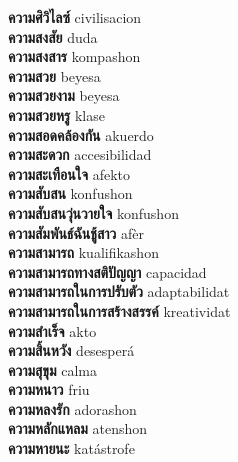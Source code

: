 \textbf{ ความศิวิไลซ์  } civilisacion \\
\textbf{ ความสงสัย  } duda \\
\textbf{ ความสงสาร  } kompashon \\
\textbf{ ความสวย  } beyesa \\
\textbf{ ความสวยงาม  } beyesa \\
\textbf{ ความสวยหรู  } klase \\
\textbf{ ความสอดคล้องกัน  } akuerdo \\
\textbf{ ความสะดวก  } accesibilidad \\
\textbf{ ความสะเทือนใจ  } afekto \\
\textbf{ ความสับสน  } konfushon \\
\textbf{ ความสับสนวุ่นวายใจ  } konfushon \\
\textbf{ ความสัมพันธ์ฉันชู้สาว  } afèr \\
\textbf{ ความสามารถ  } kualifikashon \\
\textbf{ ความสามารถทางสติปัญญา  } capacidad \\
\textbf{ ความสามารถในการปรับตัว  } adaptabilidat \\
\textbf{ ความสามารถในการสร้างสรรค์  } kreatividat \\
\textbf{ ความสำเร็จ  } akto \\
\textbf{ ความสิ้นหวัง  } desesperá \\
\textbf{ ความสุขุม  } calma \\
\textbf{ ความหนาว  } friu \\
\textbf{ ความหลงรัก  } adorashon \\
\textbf{ ความหลักแหลม  } atenshon \\
\textbf{ ความหายนะ  } katástrofe \\
